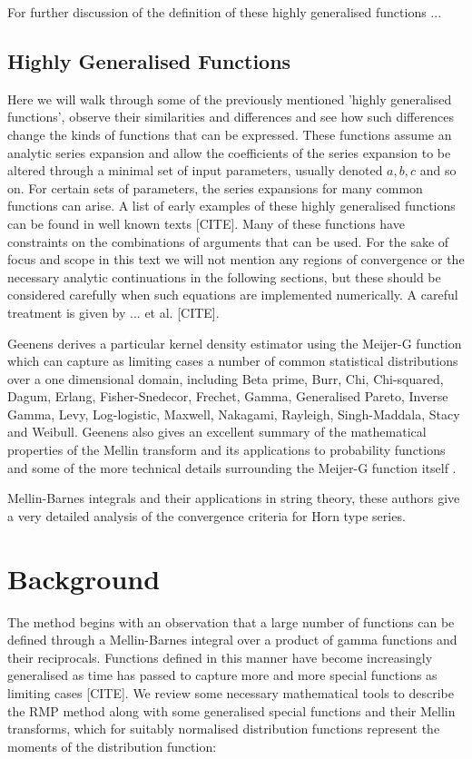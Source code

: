 \documentclass{article}
\begin{document}
{\color{red} For further discussion of the definition of these highly generalised functions ...}

{\color{red} \subsection{Highly Generalised Functions}
Here we will walk through some of the previously mentioned 'highly generalised functions', observe their similarities and differences and see how such differences change the kinds of functions that can be expressed. These functions assume an analytic series expansion and allow the coefficients of the series expansion to be altered through a minimal set of input parameters, usually denoted $a,b,c$ and so on. For certain sets of parameters, the series expansions for many common functions can arise. A list of early examples of these highly generalised functions can be found in well known texts [CITE]. Many of these functions have constraints on the combinations of arguments that can be used. For the sake of focus and scope in this text we will not mention any regions of convergence or the necessary analytic continuations in the following sections, but these should be considered carefully when such equations are implemented numerically. A careful treatment is given by ... et al. [CITE]. }







Geenens \citep{Geenens2017} derives a particular kernel density estimator using the Meijer-G function which can capture as limiting cases a number of common statistical distributions over a one dimensional domain, including Beta prime, Burr, Chi, Chi-squared, Dagum, Erlang, Fisher-Snedecor, Frechet, Gamma, Generalised Pareto, Inverse Gamma, Levy, Log-logistic, Maxwell, Nakagami, Rayleigh, Singh-Maddala, Stacy and Weibull. Geenens also gives an excellent summary of the mathematical properties of the Mellin transform and its applications to probability functions and some of the more technical details surrounding the Meijer-G function itself \citep{Geenens2017}.

\citep{Passare1996} Mellin-Barnes integrals and their applications in string theory, these authors give a very detailed analysis of the convergence criteria for Horn type series.



\section{Background}
The method begins with an observation that a large number of functions can be defined through a Mellin-Barnes integral over a product of gamma functions and their reciprocals. Functions defined in this manner have become increasingly generalised as time has passed to capture more and more special functions as limiting cases [CITE]. We review some necessary mathematical tools to describe the RMP method along with some generalised special functions and their Mellin transforms, which for suitably normalised distribution functions represent the moments of the distribution function:
\end{document}
